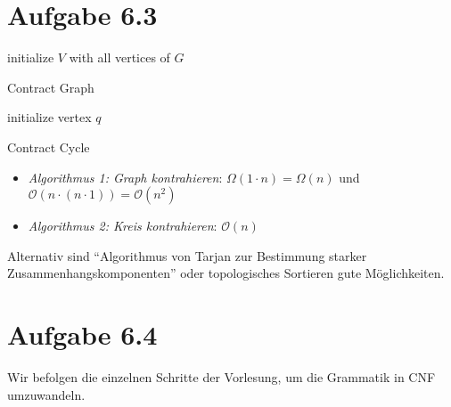 \documentclass{article}
\begin{document}
\section*{Aufgabe 6.3}
\begin{algorithm}[H]
  initialize $V$ with all vertices of $G$\;
  \caption{Contract Graph}
\end{algorithm}

\begin{algorithm}[H]
  initialize vertex $q$\;
  \caption{Contract Cycle}
\end{algorithm}

\begin{itemize}
	\item \textit{Algorithmus 1: Graph kontrahieren}: $\Omega(1 \cdot n) = \Omega(n)$ und $\mathcal{O}(n \cdot (n \cdot 1)) = \mathcal{O}(n^2)$
  \item \textit{Algorithmus 2: Kreis kontrahieren}: $\mathcal{O}(n)$
\end{itemize}

Alternativ sind ``Algorithmus von Tarjan zur Bestimmung starker Zusammenhangskomponenten'' oder topologisches Sortieren gute Möglichkeiten.



\section*{Aufgabe 6.4}
Wir befolgen die einzelnen Schritte der Vorlesung, um die Grammatik in CNF umzuwandeln.
\end{document}
